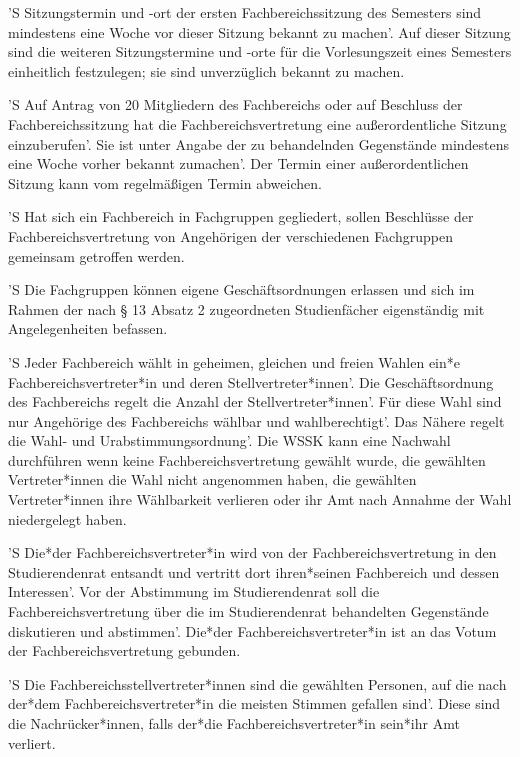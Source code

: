 \documentclass[fontsize=12pt,parskip=half]{scrartcl}
\begin{document}
\begin{contract}
  'S Sitzungstermin und -ort der ersten Fachbereichssitzung des Semesters sind
  mindestens eine Woche vor dieser Sitzung bekannt zu machen'. Auf dieser Sitzung
  sind die weiteren Sitzungstermine und -orte für die Vorlesungszeit eines
  Semesters einheitlich festzulegen; sie sind unverzüglich bekannt zu machen.

  'S Auf Antrag von 20 Mitgliedern des Fachbereichs oder auf Beschluss der
  Fachbereichssitzung hat die Fachbereichsvertretung eine außerordentliche
  Sitzung einzuberufen'. Sie ist unter Angabe der zu behandelnden Gegenstände
  mindestens eine Woche vorher bekannt zumachen'. Der Termin einer
  außerordentlichen Sitzung kann vom regelmäßigen Termin abweichen.



  'S Hat sich ein Fachbereich in Fachgruppen gegliedert, sollen Beschlüsse der
  Fachbereichsvertretung von Angehörigen der verschiedenen Fachgruppen gemeinsam
  getroffen werden.


  'S Die Fachgruppen können eigene Geschäftsordnungen erlassen und sich im Rahmen
  der nach § 13 Absatz 2 zugeordneten Studienfächer eigenständig mit
  Angelegenheiten befassen.



  'S Jeder Fachbereich wählt in geheimen, gleichen und freien Wahlen ein*e
  Fachbereichsvertreter*in und deren Stellvertreter*innen'. Die Geschäftsordnung
  des Fachbereichs regelt die Anzahl der Stellvertreter*innen'. Für diese Wahl
  sind nur Angehörige des Fachbereichs wählbar und wahlberechtigt'. Das Nähere
  regelt die Wahl- und Urabstimmungsordnung'. Die WSSK kann eine Nachwahl
  durchführen wenn keine Fachbereichsvertretung gewählt wurde, die gewählten
  Vertreter*innen die Wahl nicht angenommen haben, die gewählten Vertreter*innen
  ihre Wählbarkeit verlieren oder ihr Amt nach Annahme der Wahl niedergelegt
  haben.

  'S Die*der Fachbereichsvertreter*in wird von der Fachbereichsvertretung in den
  Studierendenrat entsandt und vertritt dort ihren*seinen Fachbereich und dessen
  Interessen'. Vor der Abstimmung im Studierendenrat soll die
  Fachbereichsvertretung über die im Studierendenrat behandelten Gegenstände
  diskutieren und abstimmen'. Die*der Fachbereichsvertreter*in ist an das Votum
  der Fachbereichsvertretung gebunden.

  'S Die Fachbereichsstellvertreter*innen sind die gewählten Personen, auf die nach
  der*dem Fachbereichsvertreter*in die meisten Stimmen gefallen sind'. Diese sind
  die Nachrücker*innen, falls der*die Fachbereichsvertreter*in sein*ihr Amt
  verliert.


\end{contract}
\end{document}
